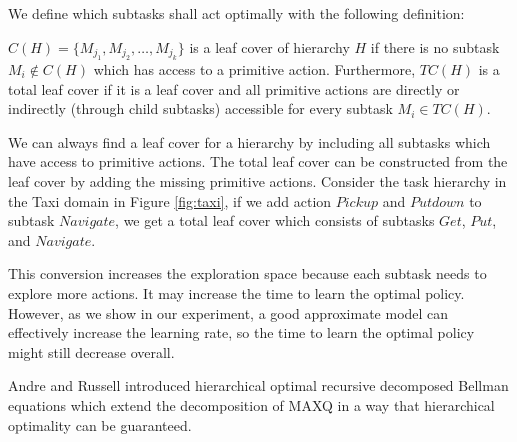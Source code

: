 
We define which subtasks shall act optimally with the following definition:
\begin{definition}
    $C(H) = \{M_{j_1}, M_{j_2}, \dots, M_{j_k}\}$ is a leaf cover of hierarchy $H$ 
    if there is no subtask $M_i \notin C(H)$ which has access to a primitive action.
    Furthermore, $TC(H)$ is a total leaf cover if it is a leaf cover and all primitive
    actions are directly or indirectly (through child subtasks) accessible for every 
    subtask $M_i \in TC(H)$.
\end{definition}

We can always find a leaf cover for a hierarchy by including all subtasks which have access
to primitive actions. The total leaf cover can be constructed from the leaf cover by
adding the missing primitive actions.
Consider the task hierarchy in the Taxi domain in Figure \ref{fig:taxi},
if we add action $Pickup$ and $Putdown$ to subtask $Navigate$, 
we get a total leaf cover which consists of subtasks $Get$, $Put$, and $Navigate$.

This conversion increases the exploration space because each subtask needs to explore more actions. It may increase 
the time to learn the optimal policy. However, as we show in our experiment, a good approximate model can effectively increase
the learning rate, so the time to learn the optimal policy might still decrease overall.


Andre and Russell \cite{Andre02, HORDQ} introduced hierarchical optimal recursive decomposed Bellman equations
which extend the decomposition of MAXQ in a way that hierarchical optimality
can be guaranteed.

